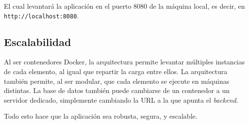 El cual levantará la aplicación en el puerto 8080 de la máquina local, es decir,
en \texttt{http://localhost:8080}.



\subsection{Escalabilidad}
Al ser contenedores Docker, la arquitectura permite levantar múltiples
instancias de cada elemento, al igual que repartir la carga entre ellos. La
arquitectura también permite, al ser modular, que cada elemento se ejecute en
máquinas distintas. La base de datos también puede cambiarse de un contenedor
a un servidor dedicado, simplemente cambiando la URL a la que apunta el
\textit{backend}.

Todo esto hace que la aplicación sea robusta, segura, y escalable.
